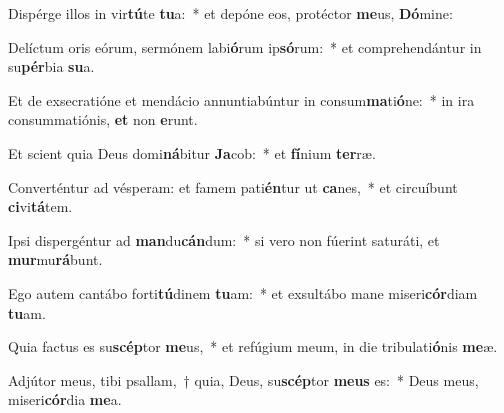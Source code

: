\item Dispérge illos in vir\textbf{tú}te \textbf{tu}a:~* et depóne eos, protéctor \textbf{me}us, \textbf{Dó}mine:
\item Delíctum oris eórum, sermónem labi\textbf{ó}rum ip\textbf{só}rum:~* et comprehendántur in su\textbf{pér}bia \textbf{su}a.
\item Et de exsecratióne et mendácio annuntiabúntur in consum\textbf{ma}ti\textbf{ó}ne:~* in ira consummatiónis, \textbf{et} non \textbf{e}runt.
\item Et scient quia Deus domi\textbf{ná}bitur \textbf{Ja}cob:~* et \textbf{fí}nium \textbf{ter}ræ.
\item Converténtur ad vésperam: et famem pati\textbf{én}tur ut \textbf{ca}nes,~* et circuíbunt \textbf{ci}vi\textbf{tá}tem.
\item Ipsi dispergéntur ad \textbf{man}du\textbf{cán}dum:~* si vero non fúerint saturáti, et \textbf{mur}mu\textbf{rá}bunt.
\item Ego autem cantábo forti\textbf{tú}dinem \textbf{tu}am:~* et exsultábo mane miseri\textbf{cór}diam \textbf{tu}am.
\item Quia factus es su\textbf{scép}tor \textbf{me}us,~* et refúgium meum, in die tribulati\textbf{ó}nis \textbf{me}æ.
\item Adjútor meus, tibi psallam,~† quia, Deus, su\textbf{scép}tor \textbf{me}\textbf{us} es:~* Deus meus, miseri\textbf{cór}dia \textbf{me}a.
